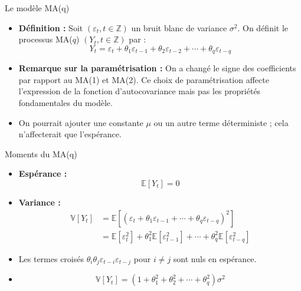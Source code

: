 \documentclass[11pt,aspectratio=169]{beamer}
\newcommand{\E}{\mathbb{E}}
\newcommand{\Var}{\mathbb{V}}
\newcommand{\Z}{\mathbb{Z}}
\begin{document}
\begin{frame}{Le modèle MA(q)}

\begin{itemize}

\item \textbf{Définition :} Soit $(\varepsilon_t, t \in \Z)$ un bruit blanc de variance $\sigma^2$. On définit le processus MA($q$) $(Y_t, t \in \Z)$ par :
\[
Y_t = \varepsilon_t + \theta_1 \varepsilon_{t-1} + \theta_2 \varepsilon_{t-2} + \cdots + \theta_q \varepsilon_{t-q}
\]

\item \textbf{Remarque sur la paramétrisation :} On a changé le signe des coefficients par rapport au MA(1) et MA(2). Ce choix de paramétrisation affecte l'expression de la fonction d'autocovariance mais pas les propriétés fondamentales du modèle.\newline

\item On pourrait ajouter une constante $\mu$ ou un autre terme déterministe ; cela n'affecterait que l'espérance.

\end{itemize}
\end{frame}

\begin{frame}{Moments du MA(q)}

\begin{itemize}

\item \textbf{Espérance :}
\[
\E[Y_t] = 0
\]

\item \textbf{Variance :}
\begin{align*}
\Var[Y_t] &= \E\left[(\varepsilon_t + \theta_1 \varepsilon_{t-1} + \cdots + \theta_q \varepsilon_{t-q})^2\right] \\
&= \E[\varepsilon_t^2] + \theta_1^2 \E[\varepsilon_{t-1}^2] + \cdots + \theta_q^2 \E[\varepsilon_{t-q}^2]
\end{align*}

\item Les termes croisés $\theta_i \theta_j \varepsilon_{t-i} \varepsilon_{t-j}$ pour $i \neq j$ sont nuls en espérance.\newline

\item \[
\boxed{\Var[Y_t] = (1 + \theta_1^2 + \theta_2^2 + \cdots + \theta_q^2) \sigma^2}
\]

\end{itemize}
\end{frame}
\end{document}

